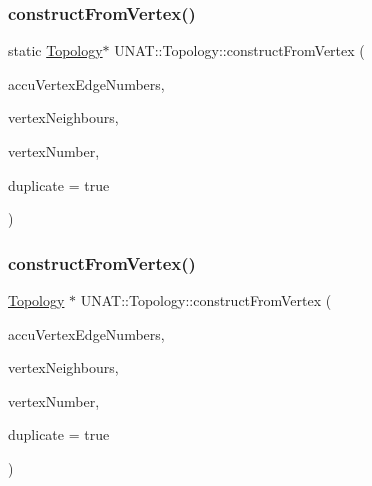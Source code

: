 \subsubsection{\texorpdfstring{constructFromVertex()}{constructFromVertex()}\hspace{0.1cm}{\footnotesize\ttfamily [1/3]}}
{\footnotesize\ttfamily static \mbox{\hyperlink{classUNAT_1_1Topology}{Topology}}$\ast$ U\+N\+A\+T\+::\+Topology\+::construct\+From\+Vertex (\begin{DoxyParamCaption}\item[{\mbox{\hyperlink{include_2swMacro_8h_a113cf5f6b5377cdf3fac6aa4e443e9aa}{sw\+Int}} $\ast$}]{accu\+Vertex\+Edge\+Numbers,  }\item[{\mbox{\hyperlink{include_2swMacro_8h_a113cf5f6b5377cdf3fac6aa4e443e9aa}{sw\+Int}} $\ast$}]{vertex\+Neighbours,  }\item[{\mbox{\hyperlink{include_2swMacro_8h_a113cf5f6b5377cdf3fac6aa4e443e9aa}{sw\+Int}}}]{vertex\+Number,  }\item[{bool}]{duplicate = {\ttfamily true} }\end{DoxyParamCaption})\hspace{0.3cm}{\ttfamily [static]}}

\mbox{\label{classUNAT_1_1Topology_aebafdfdace5d76dbfc354183a3cddee5}} 
\subsubsection{\texorpdfstring{constructFromVertex()}{constructFromVertex()}\hspace{0.1cm}{\footnotesize\ttfamily [2/3]}}
{\footnotesize\ttfamily \mbox{\hyperlink{classUNAT_1_1Topology}{Topology}} $\ast$ U\+N\+A\+T\+::\+Topology\+::construct\+From\+Vertex (\begin{DoxyParamCaption}\item[{\mbox{\hyperlink{include_2swMacro_8h_a113cf5f6b5377cdf3fac6aa4e443e9aa}{sw\+Int}} $\ast$}]{accu\+Vertex\+Edge\+Numbers,  }\item[{\mbox{\hyperlink{include_2swMacro_8h_a113cf5f6b5377cdf3fac6aa4e443e9aa}{sw\+Int}} $\ast$}]{vertex\+Neighbours,  }\item[{\mbox{\hyperlink{include_2swMacro_8h_a113cf5f6b5377cdf3fac6aa4e443e9aa}{sw\+Int}}}]{vertex\+Number,  }\item[{bool}]{duplicate = {\ttfamily true} }\end{DoxyParamCaption})\hspace{0.3cm}{\ttfamily [static]}}


